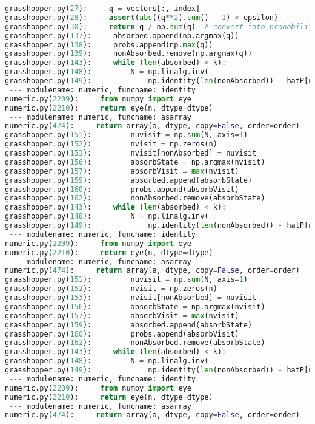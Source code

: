 \documentclass[11pt]{article}
\begin{document}
\begin{lstlisting}[language=Python]
grasshopper.py(27):     q = vectors[:, index]
grasshopper.py(28):     assert(abs((q**2).sum() - 1) < epsilon)
grasshopper.py(30):     return q / np.sum(q)  # convert into probability distribution
grasshopper.py(137):     absorbed.append(np.argmax(q))
grasshopper.py(138):     probs.append(np.max(q))
grasshopper.py(139):     nonAbsorbed.remove(np.argmax(q))
grasshopper.py(143):     while (len(absorbed) < k):
grasshopper.py(148):         N = np.linalg.inv(
grasshopper.py(149):             np.identity(len(nonAbsorbed)) - hatP[nonAbsorbed, nonAbsorbed])
 --- modulename: numeric, funcname: identity
numeric.py(2209):     from numpy import eye
numeric.py(2210):     return eye(n, dtype=dtype)
 --- modulename: numeric, funcname: asarray
numeric.py(474):     return array(a, dtype, copy=False, order=order)
grasshopper.py(151):         nuvisit = np.sum(N, axis=1)
grasshopper.py(152):         nvisit = np.zeros(n)
grasshopper.py(153):         nvisit[nonAbsorbed] = nuvisit
grasshopper.py(156):         absorbState = np.argmax(nvisit)
grasshopper.py(157):         absorbVisit = max(nvisit)
grasshopper.py(159):         absorbed.append(absorbState)
grasshopper.py(160):         probs.append(absorbVisit)
grasshopper.py(162):         nonAbsorbed.remove(absorbState)
grasshopper.py(143):     while (len(absorbed) < k):
grasshopper.py(148):         N = np.linalg.inv(
grasshopper.py(149):             np.identity(len(nonAbsorbed)) - hatP[nonAbsorbed, nonAbsorbed])
 --- modulename: numeric, funcname: identity
numeric.py(2209):     from numpy import eye
numeric.py(2210):     return eye(n, dtype=dtype)
 --- modulename: numeric, funcname: asarray
numeric.py(474):     return array(a, dtype, copy=False, order=order)
grasshopper.py(151):         nuvisit = np.sum(N, axis=1)
grasshopper.py(152):         nvisit = np.zeros(n)
grasshopper.py(153):         nvisit[nonAbsorbed] = nuvisit
grasshopper.py(156):         absorbState = np.argmax(nvisit)
grasshopper.py(157):         absorbVisit = max(nvisit)
grasshopper.py(159):         absorbed.append(absorbState)
grasshopper.py(160):         probs.append(absorbVisit)
grasshopper.py(162):         nonAbsorbed.remove(absorbState)
grasshopper.py(143):     while (len(absorbed) < k):
grasshopper.py(148):         N = np.linalg.inv(
grasshopper.py(149):             np.identity(len(nonAbsorbed)) - hatP[nonAbsorbed, nonAbsorbed])
 --- modulename: numeric, funcname: identity
numeric.py(2209):     from numpy import eye
numeric.py(2210):     return eye(n, dtype=dtype)
 --- modulename: numeric, funcname: asarray
numeric.py(474):     return array(a, dtype, copy=False, order=order)

\end{lstlisting}
\end{document}
